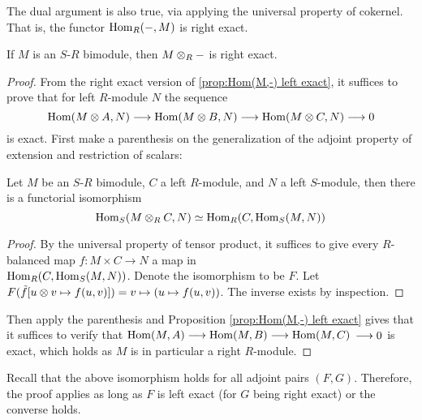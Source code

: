 \documentclass{article}
\begin{document}
\begin{remark}
    The dual argument is also true, via applying the universal property of cokernel. That is, the functor $\mathrm{Hom}_R(-, M)$ is right exact. 
\end{remark}

\begin{proposition}
    If $M$ is an $S$-$R$ bimodule, then $M \otimes_R -$ is right exact. 
\end{proposition}

\begin{proof}
    From the right exact version of \ref{prop:Hom(M,-) left exact}, it suffices to prove that for left $R$-module $N$ the sequence
    \[
        \mathrm{Hom}(M \otimes A, N) \longrightarrow \mathrm{Hom}(M \otimes B, N) \longrightarrow \mathrm{Hom}(M \otimes C, N) \longrightarrow 0
    \]
    is exact. First make a parenthesis on the generalization of the adjoint property of extension and restriction of scalars:

    \begin{parenthesis}
        Let $M$ be an $S$-$R$ bimodule, $C$ a left $R$-module, and $N$ a left $S$-module, then there is a functorial isomorphism
        \[
            \mathrm{Hom}_S(M \otimes_R C, N) \simeq \mathrm{Hom}_R(C, \mathrm{Hom}_S(M, N))
        \]
    \end{parenthesis}

    \begin{proof}
        By the universal property of tensor product, it suffices to give every $R$-balanced map $f: M \times C \to N$ a map in \\ $\mathrm{Hom}_R(C, \mathrm{Hom}_S(M, N))$. Denote the isomorphism to be $F$. Let $F(\tilde{f}[u\otimes v \mapsto f(u, v)]) = v\mapsto (u \mapsto f(u, v))$. The inverse exists by inspection.
    \end{proof}

    Then apply the parenthesis and Proposition \ref{prop:Hom(M,-) left exact} gives that it suffices to verify that $\mathrm{Hom}(M, A) \longrightarrow \mathrm{Hom}(M, B) \longrightarrow \mathrm{Hom}(M, C)$ $\longrightarrow 0$ is exact, which holds as $M$ is in particular a right $R$-module. 
\end{proof}

\begin{remark}
    Recall that the above isomorphism holds for all adjoint pairs $(F, G)$. Therefore, the proof applies as long as $F$ is left exact (for $G$ being right exact) or the converse holds. 
\end{remark}
\end{document}
